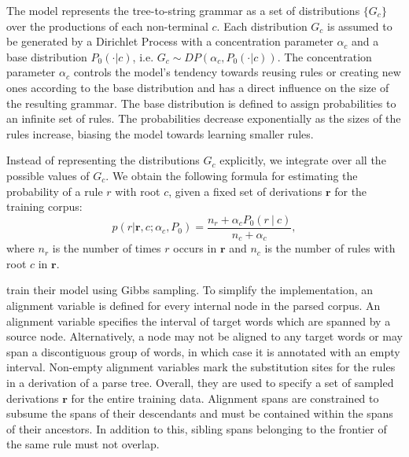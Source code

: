\documentclass[nofonts]{pbml} %
\begin{document}
The model represents the tree-to-string grammar as a set of distributions $\{G_c\}$ over the productions of each non-terminal $c$. Each distribution $G_c$ is assumed to be generated by a Dirichlet Process with a concentration parameter $\alpha_c$ and a base distribution $P_0(\cdot | c)$, i.e. $G_c \sim DP(\alpha_c, P_0(\cdot | c))$. The concentration parameter $\alpha_c$ controls the model's tendency towards reusing rules or creating new ones according to the base distribution and has a direct influence on the size of the resulting grammar. The base distribution is defined to assign probabilities to an infinite set of rules. The probabilities decrease exponentially as the sizes of the rules increase, biasing the model towards learning smaller rules.

Instead of representing the distributions $G_c$ explicitly, we integrate over all the possible values of $G_c$. We obtain the following formula for estimating the probability of a rule $r$ with root $c$, given a fixed set of derivations $\textbf{r}$ for the training corpus:
\begin{equation}
p(r | \textbf{r}, c; \alpha_c, P_0) = \frac{n_{r} + \alpha_c P_0(r\ |\ c)}{n_{c} + \alpha_c},
\label{eq:sampling}
\end{equation}
where $n_{r}$ is the number of times $r$ occurs in $\textbf{r}$ and $n_{c}$ is the number of rules with root $c$ in $\textbf{r}$.

\citet{Cohn2009} train their model using Gibbs sampling. To simplify the implementation, an alignment variable is defined for every internal node in the parsed corpus. An alignment variable specifies the interval of target words which are spanned by a source node. Alternatively, a node may not be aligned to any target words or may span a discontiguous group of words, in which case it is annotated with an empty interval. Non-empty alignment variables mark the substitution sites for the rules in a derivation of a parse tree. Overall, they are used to specify a set of sampled derivations $\textbf{r}$ for the entire training data. Alignment spans are constrained to subsume the spans of their descendants and must be contained within the spans of their ancestors. In addition to this, sibling spans belonging to the frontier of the same rule must not overlap.
\end{document}
